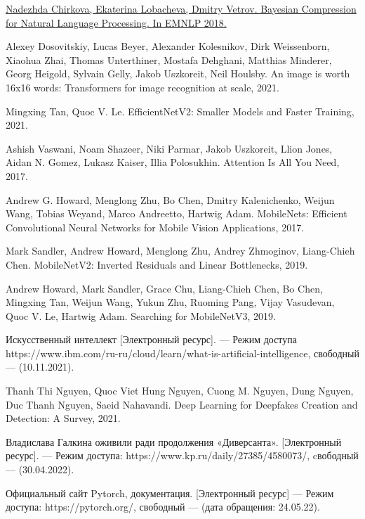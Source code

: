 \newpage 
\printbibliography[heading=bibintoc] 

\begin{thebibliography}{0}
	\hypertarget{chirkova18}{}
	\href{https://arxiv.org/abs/1810.10927}
	{Nadezhda Chirkova, Ekaterina Lobacheva, Dmitry Vetrov. Bayesian Compression for Natural Language Processing. In EMNLP 2018.}
	
	Alexey Dosovitskiy, Lucas Beyer, Alexander Kolesnikov, Dirk Weissenborn, Xiaohua Zhai, Thomas Unterthiner, Mostafa Dehghani, Matthias Minderer,
	Georg Heigold, Sylvain Gelly, Jakob Uszkoreit, Neil Houlsby. An image is worth 16x16 words: Transformers for image recognition at scale, 2021.
	
	Mingxing Tan, Quoc V. Le. EfficientNetV2: Smaller Models and Faster Training, 2021.
	
	Ashish Vaswani, Noam Shazeer, Niki Parmar, Jakob Uszkoreit, Llion Jones, Aidan N. Gomez, Lukasz Kaiser, Illia Polosukhin. Attention Is All You Need, 2017.
	
	Andrew G. Howard, Menglong Zhu, Bo Chen, Dmitry Kalenichenko, Weijun Wang, Tobias Weyand, Marco Andreetto, Hartwig Adam. MobileNets: Efficient Convolutional Neural Networks for Mobile Vision Applications, 2017.
	
	Mark Sandler, Andrew Howard, Menglong Zhu, Andrey Zhmoginov, Liang-Chieh Chen. MobileNetV2: Inverted Residuals and Linear Bottlenecks, 2019.
	
	Andrew Howard, Mark Sandler, Grace Chu, Liang-Chieh Chen, Bo Chen, Mingxing Tan,
	Weijun Wang, Yukun Zhu, Ruoming Pang, Vijay Vasudevan, Quoc V. Le, Hartwig Adam. Searching for MobileNetV3, 2019.
	
	Искусственный интеллект [Электронный ресурс]. — Режим доступа https://www.ibm.com/ru-ru/cloud/learn/what-is-artificial-intelligence, свободный — (10.11.2021).
	
	Thanh Thi Nguyen, Quoc Viet Hung Nguyen, Cuong M. Nguyen, Dung Nguyen, Duc Thanh Nguyen, Saeid Nahavandi. Deep Learning for Deepfakes Creation and
	Detection: A Survey, 2021.
	
	 Владислава Галкина оживили ради продолжения «Диверсанта». [Электронный ресурс]. — Режим доступа: https://www.kp.ru/daily/27385/4580073/, cвободный — (30.04.2022).
	
	 Официальный сайт Pytorch, документация. [Электронный ресурс] — Режим доступа: https://pytorch.org/, свободный — (дата обращения: 24.05.22).
	
\end{thebibliography}

